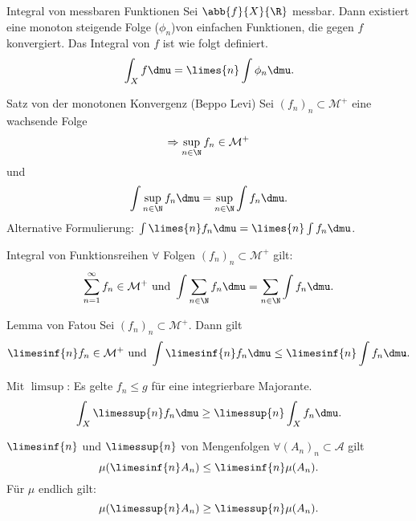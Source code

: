 \begin{karte}{Integral von messbaren Funktionen}
	Sei \( \abb{f}{X}{\R} \) messbar. Dann existiert eine monoton steigende 
	Folge (\( \phi_n\))von einfachen Funktionen, die gegen \(f\) konvergiert.
	Das Integral von \(f\) ist wie folgt definiert.
	\[ \int_X f \dmu = \limes{n} \int \phi_n \dmu. \]
\end{karte}

\begin{karte}{Satz von der monotonen Konvergenz (Beppo Levi)}
	Sei \( (f_n)_n \subset \mathcal{M}^+ \) eine wachsende Folge
	\[ \Rightarrow \sup_{n\in\N} f_n \in \mathcal{M}^+ \] und 
	\[ \int \sup_{n\in\N} f_n \dmu 
	= \sup_{n\in\N} \int f_n \dmu. \]
	Alternative Formulierung: 
	\( \int \limes{n} f_n \dmu 
	= \limes{n} \int f_n \dmu \).
\end{karte}

\begin{karte}{Integral von Funktionsreihen}
	\( \forall \) Folgen \( (f_n)_n \subset \mathcal{M}^+ \) gilt: 
	\[ \sum_{n=1}^{\infty} f_n \in \mathcal{M}^+ \text{ und } \int \sum_{n\in\N} f_n \dmu 
	= \sum_{n\in\N} \int f_n \dmu. \]
\end{karte}

\begin{karte}{Lemma von Fatou}
	Sei \( (f_n)_n \subset \mathcal{M}^+ \). Dann gilt 
	\[ \limesinf{n} f_n \in \mathcal{M}^+ 
	\text{ und } \int \limesinf{n} f_n \dmu \leq \limesinf{n} \int f_n \dmu. \]

	Mit \(\limsup\): Es gelte \( f_n \leq g \) für eine integrierbare Majorante. 
	\[ \int_X \limessup{n} f_n \dmu \geq \limessup{n} \int_X f_n \dmu. \]
\end{karte}

\begin{karte}{\(\limesinf{n}\) und \( \limessup{n} \) von Mengenfolgen}
	\( \forall (A_n)_n \subset \mathcal{A} \) gilt 
	\[ \mu(\limesinf{n} A_n) \leq \limesinf{n} \mu(A_n). \]
	Für \( \mu \) endlich gilt: 
	\[ \mu(\limessup{n} A_n) \geq \limessup{n} \mu(A_n). \]
\end{karte}